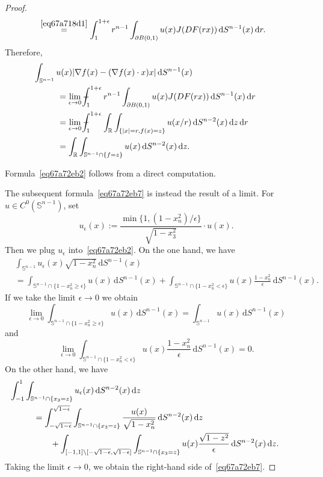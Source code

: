 \documentclass[a4paper,9pt]{amsart}
\newcommand{\bb}[1]{\mathbb{#1}}
\newcommand{\R}{\mathbb{R}}	%
\newcommand{\did}{\,\mathrm{d}}	%
\newcommand{\de}{\partial}		%
\newcommand{\grad}{\nabla}
\def\Xint#1{\mathchoice
      {\XXint\displaystyle\textstyle{#1}}%
      {\XXint\textstyle\scriptstyle{#1}}%
      {\XXint\scriptstyle\scriptscriptstyle{#1}}%
      {\XXint\scriptscriptstyle\scriptscriptstyle{#1}}%
      \!\int}
\def\XXint#1#2#3{{\setbox0=\hbox{$#1{#2#3}{\int}$}
        \vcenter{\hbox{$#2#3$}}\kern-.5\wd0}}
\def\fint{\Xint-}
\theoremstyle{plain}
\theoremstyle{definition}
\theoremstyle{remark}
\begin{document}
\begin{proof}
\begin{align*}
	&\overset{\eqref{eq67a718d1}}= \int_1^{1+\epsilon} r^{n-1} \int_{\de B(0,1)}  u(x) J(DF(rx)) \did S^{n-1}(x) \did r .
	\end{align*}
	Therefore,
	\begin{align*}
	&\hspace{-1cm}\int_{\bb S^{n-1}} u(x) |\grad f(x)-(\grad f(x)\cdot x)x| \did S^{n-1}(x) \\
	&= \lim_{\epsilon\to0} \fint_1^{1+\epsilon} r^{n-1} \int_{\de B(0,1)}  u(x) J(DF(rx)) \did S^{n-1}(x) \did r \\
	&= \lim_{\epsilon\to0} \fint_1^{1+\epsilon} \int_{\R} \int_{\{|x| = r, f(x) = z\}} u(x/r) \did S^{n-2}(x) \did z \did r  \\
	&= \int_\R \int_{\bb S^{n-1}\cap \{f=z\}} u(x) \did S^{n-2}(x) \did z .
	\end{align*}
	
	Formula~\eqref{eq67a72eb2} follows from a direct computation.
	
	The subsequent formula~\eqref{eq67a72eb7} is instead the result of a limit.
	For $u\in C^0(\bb S^{n-1})$, set 
	\[
	u_\epsilon(x) := \frac{\min\{ 1 , (1-x_n^2)/\epsilon \}}{\sqrt{1-x_3^2}} \cdot u(x) .
	\]
	Then we plug $u_\epsilon$ into~\eqref{eq67a72eb2}.
	On the one hand, we have
	\begin{align*}
	&\int_{\bb S^{n-1}} u_\epsilon(x) \sqrt{1-x_n^2} \did S^{n-1}(x) \\
	&= \int_{\bb S^{n-1}\cap \{1-x_n^2\ge\epsilon\} } u(x) \did S^{n-1}(x) 
		+ \int_{\bb S^{n-1}\cap \{1-x_n^2<\epsilon\} } u(x) \frac{1-x_n^2}{\epsilon} \did S^{n-1}(x) .
	\end{align*}
	If we take the limit $\epsilon\to0$ we obtain
	\[
	\lim_{\epsilon\to 0} \int_{\bb S^{n-1}\cap \{1-x_n^2\ge\epsilon\} } u(x) \did S^{n-1}(x)
	= \int_{\bb S^{n-1}} u(x) \did S^{n-1}(x)
	\]
	and
	\[
	\lim_{\epsilon\to 0} \int_{\bb S^{n-1}\cap \{1-x_n^2<\epsilon\} } u(x) \frac{1-x_n^2}{\epsilon} \did S^{n-1}(x)
	= 0 .
	\]
	On the other hand, we have
	\begin{align*}
		&\hspace{-1cm}\int_{-1}^1 \int_{\bb S^{n-1}\cap \{x_3=z\}} u_\epsilon(x) \did S^{n-2}(x) \did z \\
		&= \int_{-\sqrt{1-\epsilon}}^{\sqrt{1-\epsilon}} \int_{\bb S^{n-1}\cap \{x_3=z\}} \frac{u(x)}{\sqrt{1-x_n^2}} \did S^{n-2}(x) \did z\\
		&\qquad+ \int_{[-1,1]\setminus[-\sqrt{1-\epsilon},\sqrt{1-\epsilon}]} \int_{\bb S^{n-1}\cap \{x_3=z\}} u(x) \frac{\sqrt{1-z^2}}{\epsilon} \did S^{n-2}(x) \did z .
	\end{align*}
	Taking the limit $\epsilon\to0$, we obtain the right-hand side of~\eqref{eq67a72eb7}.
	

\end{proof}
\end{document}
